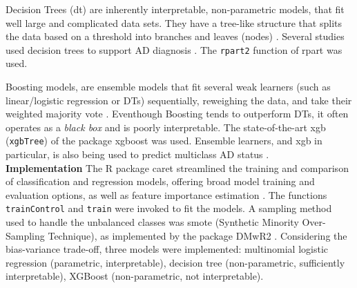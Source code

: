 \documentclass{amsart}
\begin{document}
Decision Trees (\acrshort{dt}) are inherently interpretable, non-parametric models, that fit well large and complicated data sets. They have a tree-like structure that splits the data based on a threshold into branches and leaves (nodes) \cite{Song2015DecisionPrediction}. Several studies used decision trees to support AD diagnosis \cite{saputra2020detecting,dana2014using,kumar2017new,mofrad2019decision}. The \texttt{rpart2} \cite{rpart} function of \textsf{rpart} was used.

Boosting models, are ensemble models that fit several weak learners (such as linear/logistic regression or DTs) sequentially, reweighing the data, and take their weighted majority vote \cite{Friedman2000boosting,Friedman2001gbm}. Eventhough Boosting tends to outperform DTs, it often operates as a \textit{black box} and is poorly interpretable. The state-of-the-art \acrlong{xgb} (\texttt{xgbTree}) of the package \textsf{xgboost} \cite{Chen2016XGBoost:System} was used. Ensemble learners, and \acrshort{xgb} in particular, is also being used to predict multiclass AD status \cite{zhang2024multiclass,app13148298}.\\

\leavevmode\newline \textbf{Implementation}\hspace{.25cm} 
The R package \textsf{caret} streamlined the training and comparison of classification and regression models, offering broad model training and evaluation options, as well as feature importance estimation \cite{Kuhn2008BuildingPackage}. The functions \texttt{trainControl} and \texttt{train} were invoked to fit the models. A sampling method used to handle the unbalanced classes was \acrshort{smote} (Synthetic Minority Over-Sampling Technique), as implemented by the package \textsf{DMwR2} \cite{DMwR2}. Considering the bias-variance trade-off, three models were implemented: multinomial logistic regression (parametric, interpretable), decision tree (non-parametric, sufficiently interpretable), XGBoost (non-parametric, not interpretable).
\end{document}
